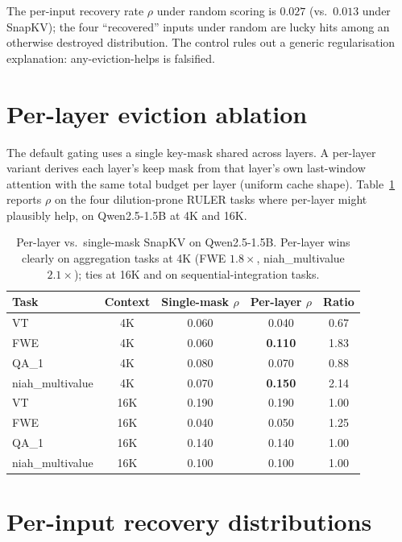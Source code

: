 \documentclass{article}
\begin{document}
The per-input recovery rate $\rho$ under random scoring is $0.027$
(vs.\ $0.013$ under SnapKV); the four ``recovered'' inputs under random
are lucky hits among an otherwise destroyed distribution. The control
rules out a generic regularisation explanation: any-eviction-helps is
falsified.

\section{Per-layer eviction ablation}
\label{app:per-layer}

The default gating uses a single key-mask shared across layers. A per-layer
variant derives each layer's keep mask from that layer's own last-window
attention with the same total budget per layer (uniform cache shape).
Table~\ref{tab:perlayer} reports $\rho$ on the four dilution-prone RULER tasks
where per-layer might plausibly help, on Qwen2.5-1.5B at 4K and 16K.

\begin{table}[h]
\centering
\caption{Per-layer vs.\ single-mask SnapKV on Qwen2.5-1.5B. Per-layer wins
clearly on aggregation tasks at 4K (FWE $1.8\times$, niah\_multivalue
$2.1\times$); ties at 16K and on sequential-integration tasks.}
\label{tab:perlayer}
\begin{tabular}{lcccc}
\toprule
Task & Context & Single-mask $\rho$ & Per-layer $\rho$ & Ratio \\
\midrule
VT               & 4K  & 0.060 & 0.040 & 0.67 \\
FWE              & 4K  & 0.060 & \textbf{0.110} & 1.83 \\
QA\_1            & 4K  & 0.080 & 0.070 & 0.88 \\
niah\_multivalue & 4K  & 0.070 & \textbf{0.150} & 2.14 \\
VT               & 16K & 0.190 & 0.190 & 1.00 \\
FWE              & 16K & 0.040 & 0.050 & 1.25 \\
QA\_1            & 16K & 0.140 & 0.140 & 1.00 \\
niah\_multivalue & 16K & 0.100 & 0.100 & 1.00 \\
\bottomrule
\end{tabular}
\end{table}

\section{Per-input recovery distributions}
\label{app:recovery-hist}
\end{document}
